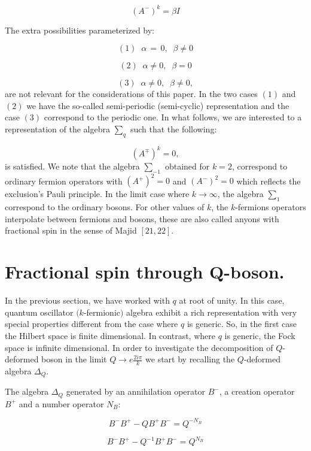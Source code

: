 \documentclass[a4paper,12pt,thmsa]{article}
\begin{document}
\begin{equation}
(A^{-})^k=\beta I
\end{equation}

The extra possibilities parameterized by:

\[
(1) \;\; \alpha \, =\, 0, \;\; \beta \neq 0
\]

\[
(2) \;\; \alpha \neq 0, \;\; \beta =0
\]

\[
(3) \;\; \alpha \neq 0, \;\;\beta \neq 0,
\]
are not relevant for the considerations of this paper. In the two cases $(1)$
and $(2)$ we have the so-called semi-periodic (semi-cyclic) representation
and the case $(3)$ correspond to the periodic one. In what follows, we are
interested to a representation of the algebra $\sum_q$ such that the
following:

\[
(A^{\mp })^k=0,
\]
is satisfied. We note that the algebra $\sum_{-1}$ obtained for $k=2$,
correspond to ordinary fermion operators with $(A^{+})^2=0$ and $(A^{-})^2=0$
which reflects the exclusion's Pauli principle. In the limit case where $%
k\rightarrow \infty $, the algebra $\sum_1$ correspond to the ordinary
bosons. For other values of $k$, the $k$-fermions operators interpolate
between fermions and bosons, these are also called anyons with fractional
spin in the sense of Majid $[21,22]$.

\section{Fractional spin through Q-boson.}

In the previous section, we have worked with $q$ at root of unity. In this
case, quantum oscillator $(k$-fermionic$)$ algebra exhibit a rich
representation with very special properties different from the case where $q$
is generic. So, in the first case the Hilbert space is finite dimensional.
In contrast, where $q$ is generic, the Fock space is infinite dimensional.
In order to investigate the decomposition of $Q$-deformed boson in the limit
$Q\rightarrow e\frac{2i\pi }k$ we start by recalling the $Q$-deformed
algebra $\Delta _Q$.

The algebra $\Delta _Q$ generated by an annihilation operator $B^{-}$, a
creation operator $B^{+}$ and a number operator $N_B$:

\begin{equation}
B^{-}B^{+}-QB^{+}B^{-}=Q^{-N_B}
\end{equation}

\begin{equation}
B^{-}B^{+}-Q^{-1}B^{+}B^{-}=Q^{N_B}
\end{equation}
\end{document}
